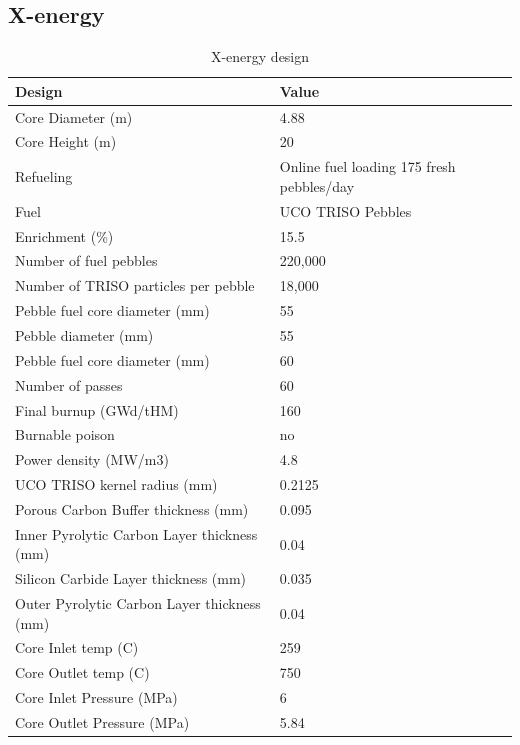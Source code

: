 \documentclass[10pt,a4paper]{article}
\begin{document}
\subsection{X-energy}

\begin{table} [ht]
\begin{center}

\caption{ X-energy design}
\begin{tabular}{|l|l|}
\hline 
Design 		&Value \\ 
\hline 
Core Diameter (m) 		&4.88 \\ 
\hline 
Core Height (m) 		&20 \\ 
\hline 
Refueling		&Online fuel loading 
175 fresh pebbles/day \\ 
\hline 
Fuel		&UCO TRISO Pebbles \\ 
\hline 
Enrichment (\%)		&15.5 \\ 
\hline 
Number of fuel pebbles		&220,000 \\ 
\hline 
Number of TRISO particles per pebble		&18,000 \\ 
\hline 
Pebble fuel core diameter (mm)		&55 \\ 
\hline 
Pebble diameter (mm)	&55 \\ 
\hline 
Pebble fuel core diameter (mm)		&60 \\ 
\hline 
Number of passes		&60\\ 
\hline 
Final burnup (GWd/tHM)		&160 \\ 
\hline 
Burnable poison		&no \\ 
\hline 
Power density (MW/m3)		&4.8 \\ 
\hline 
UCO TRISO kernel radius (mm)	&0.2125 \\ 
\hline 
Porous Carbon Buffer thickness (mm)	&0.095 \\ 
\hline 
Inner Pyrolytic Carbon Layer thickness (mm) 	&0.04 \\ 
\hline 
Silicon Carbide Layer thickness (mm)	&0.035 \\ 
\hline 
Outer Pyrolytic Carbon Layer thickness (mm)	&0.04 \\ 
\hline 
Core Inlet temp (C)	&259 \\ 
\hline 
Core Outlet temp (C) 	&750 \\ 
\hline 
Core Inlet Pressure (MPa)	&6 \\ 
\hline 
Core Outlet Pressure (MPa)	&5.84 \\ 
\hline 

\end{tabular}
\end{center}
\end{table}
\end{document}

